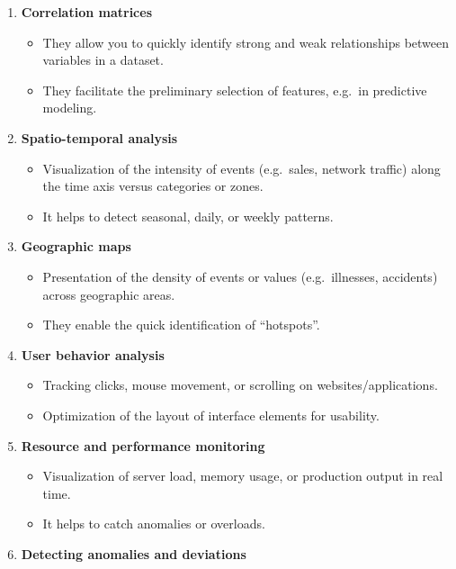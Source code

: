 \documentclass[
  english,
  letterpaper,
  DIV=11,
  numbers=noendperiod]{scrreprt}
\providecommand{\tightlist}{%
  \setlength{\itemsep}{0pt}\setlength{\parskip}{0pt}}
\begin{document}
\begin{enumerate}
\def\labelenumi{\arabic{enumi}.}
\tightlist
\item
  \textbf{Correlation matrices}

  \begin{itemize}
  \tightlist
  \item
    They allow you to quickly identify strong and weak relationships
    between variables in a dataset.\\
  \item
    They facilitate the preliminary selection of features, e.g.~in
    predictive modeling.
  \end{itemize}
\item
  \textbf{Spatio-temporal analysis}

  \begin{itemize}
  \tightlist
  \item
    Visualization of the intensity of events (e.g.~sales, network
    traffic) along the time axis versus categories or zones.\\
  \item
    It helps to detect seasonal, daily, or weekly patterns.
  \end{itemize}
\item
  \textbf{Geographic maps}

  \begin{itemize}
  \tightlist
  \item
    Presentation of the density of events or values (e.g.~illnesses,
    accidents) across geographic areas.\\
  \item
    They enable the quick identification of ``hotspots''.
  \end{itemize}
\item
  \textbf{User behavior analysis}

  \begin{itemize}
  \tightlist
  \item
    Tracking clicks, mouse movement, or scrolling on
    websites/applications.\\
  \item
    Optimization of the layout of interface elements for usability.
  \end{itemize}
\item
  \textbf{Resource and performance monitoring}

  \begin{itemize}
  \tightlist
  \item
    Visualization of server load, memory usage, or production output in
    real time.\\
  \item
    It helps to catch anomalies or overloads.
  \end{itemize}
\item
  \textbf{Detecting anomalies and deviations}


\end{enumerate}
\end{document}
